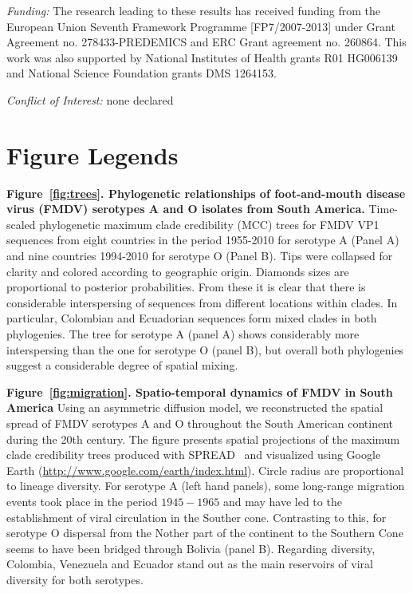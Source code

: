 \documentclass[10pt]{article}
\begin{document}
\emph{Funding:} The research leading to these results has received funding from the European Union Seventh Framework Programme [FP7/2007-2013] under Grant Agreement no. 278433-PREDEMICS and ERC Grant agreement no. 260864.
This work was also supported by National Institutes of Health grants R01 HG006139 and National Science Foundation grants DMS 1264153.

\emph{Conflict of Interest:} none declared

\newpage

\section*{Figure Legends}


{\bf Figure~\ref{fig:trees}. Phylogenetic relationships of foot-and-mouth disease virus (FMDV) serotypes A and O isolates from South America.} Time-scaled phylogenetic maximum clade credibility (MCC) trees for FMDV VP1 sequences from eight countries in the period 1955-2010 for serotype A (Panel A) and nine countries 1994-2010 for serotype O (Panel B).
Tips were collapsed for clarity and colored according to geographic origin.
Diamonds sizes are proportional to posterior probabilities.
From these it is clear that there is considerable interspersing of sequences from different locations within clades.
In particular, Colombian and Ecuadorian sequences form mixed clades in both phylogenies.
The tree for serotype A (panel A) shows considerably more interspersing than the one for serotype O (panel B), but overall both phylogenies suggest a considerable degree of spatial mixing.

{\bf Figure~\ref{fig:migration}. Spatio-temporal dynamics of FMDV in South America} Using an asymmetric diffusion model, we reconstructed the spatial spread of FMDV serotypes A and O throughout the South American continent during the 20th century.
The figure presents spatial projections of the maximum clade credibility trees produced with SPREAD~\cite{spread} and visualized using Google Earth (\url{http://www.google.com/earth/index.html}).
Circle radius are proportional to lineage diversity.
For serotype A (left hand panels), some long-range migration events took place in the period $1945-1965$ and may have led to the establishment of viral circulation in the Souther cone.
Contrasting to this, for serotype O dispersal from the Nother part of the continent to the Southern Cone seems to have been bridged through Bolivia (panel B).
Regarding diversity, Colombia, Venezuela and Ecuador stand out as the main reservoirs of viral diversity for both serotypes.
\end{document}
